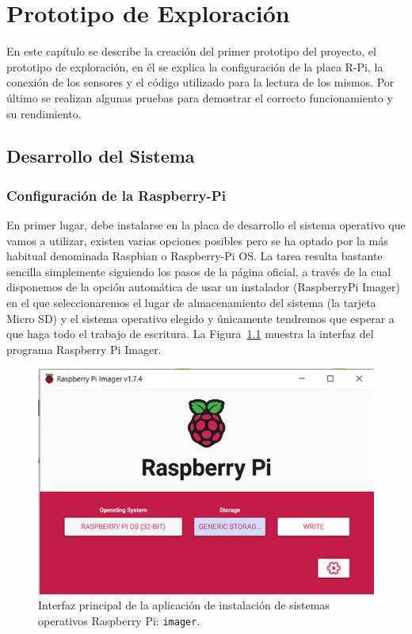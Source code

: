 \chapter{Prototipo de Exploración}\label{cap.prototipoExploracion}

En este capítulo se describe la creación del primer prototipo del proyecto, el prototipo de exploración, en él se explica la configuración de la placa R-Pi, la conexión de los sensores y el código utilizado para la lectura de los mismos. Por último se realizan algunas pruebas para demostrar el correcto funcionamiento y su rendimiento.


\section{Desarrollo del Sistema}

\subsection{Configuración de la Raspberry-Pi}
En primer lugar, debe instalarse en la placa de desarrollo el sistema operativo que vamos a utilizar, existen varias opciones posibles pero se ha optado por la más habitual denominada Raspbian o Raspberry-Pi OS.
La tarea resulta bastante sencilla simplemente siguiendo los pasos de la página oficial, a través de la cual disponemos de la opción automática de usar un instalador (RaspberryPi Imager) en el que seleccionaremos el lugar de almacenamiento del sistema (la tarjeta Micro SD) y el sistema operativo elegido y únicamente tendremos que esperar a que haga todo el trabajo de escritura. La Figura~\ref{fig:raImager} muestra la interfaz del programa Raspberry Pi Imager.

\begin{figure}[tbh]
\centering
\includegraphics[scale=0.6]{images/raspberryImager}
\caption[Interfaz instalación Raspberry Pi]{Interfaz principal de la aplicación de instalación de sistemas operativos Raspberry Pi: {\protect\tt imager}.}%
\label{fig:raImager}
\end{figure}

